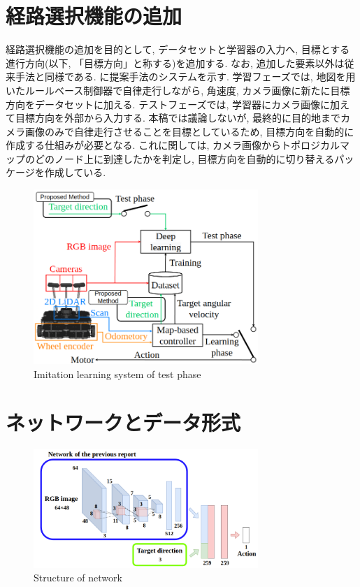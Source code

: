 \documentclass{jarticle}
\begin{document}
\section{経路選択機能の追加}
経路選択機能の追加を目的として, データセットと学習器の入力へ, 目標とする進行方向(以下, 「目標方向」と称する)を追加する. なお, 追加した要素以外は従来手法と同様である. に提案手法のシステムを示す. 学習フェーズでは, 地図を用いたルールベース制御器で自律走行しながら, 角速度, カメラ画像に新たに目標方向をデータセットに加える. テストフェーズでは, 学習器にカメラ画像に加えて目標方向を外部から入力する. 本稿では議論しないが, 最終的に目的地までカメラ画像のみで自律走行させることを目標としているため, 目標方向を自動的に作成する仕組みが必要となる. これに関しては, カメラ画像からトポロジカルマップのどのノード上に到達したかを判定し, 目標方向を自動的に切り替えるパッケージを作成している.

\begin{figure}[h]
  \centering
   \includegraphics[width=85mm]{system2.png}
   \vspace*{-4mm}
   \caption{Imitation learning system of test phase}
   \label{fig: fig3}
 \end{figure}

\section{ネットワークとデータ形式}


\begin{figure}[h]
  \centering
   \includegraphics[width=85mm]{network.png}
   \vspace*{-4mm}
   \caption{Structure of network}
   \label{fig: fig4}
 \end{figure}
\end{document}
